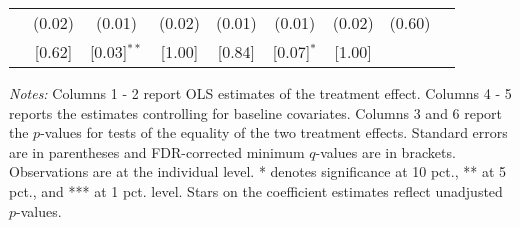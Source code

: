 \begin{table}[htbp]
{\begin{threeparttable}
\begin{tabular}{l*{8}{c}}
          &   (0.02)&   (0.01)&   (0.02)&   (0.01)&   (0.01)&   (0.02)&   (0.60)&         \\
          &   [0.62]&[0.03]$^{**}$&   [1.00]&   [0.84]&[0.07]$^{*}$&   [1.00]&         &         \\
\bottomrule \end{tabular} \begin{tablenotes}[flushleft] \footnotesize \item \emph{Notes:} Columns 1 - 2 report OLS estimates of the treatment effect. Columns 4 - 5 reports the estimates controlling for baseline covariates. Columns 3 and 6 report the \(p\)-values for tests of the equality of the two treatment effects. Standard errors are in parentheses and FDR-corrected minimum \(q\)-values are in brackets. Observations are at the individual level. * denotes significance at 10 pct., ** at 5 pct., and *** at 1 pct. level. Stars on the coefficient estimates reflect unadjusted \(p\)-values. \end{tablenotes} \end{threeparttable} } \end{table}

